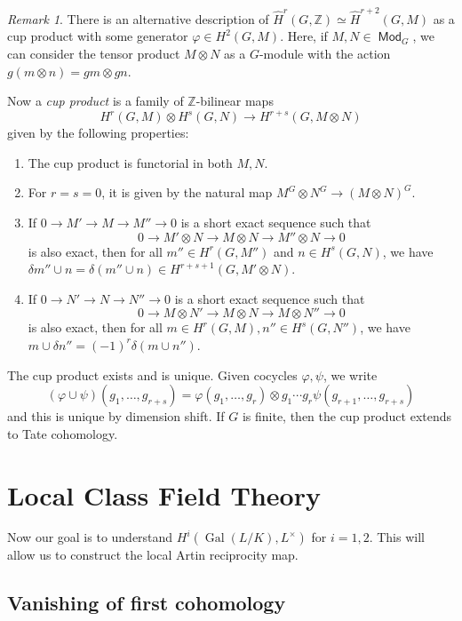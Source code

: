 \documentclass[leqno, openany]{memoir}
\theoremstyle{definition}
\theoremstyle{remark}
\newtheorem{rmk}[thm]{Remark}
\theoremstyle{plain}
\theoremstyle{definition}
\theoremstyle{remark}
\newcommand{\Z}{\mathbb{Z}}
\newcommand{\wh}[1]{\widehat{#1}}
\DeclareMathOperator{\Gal}{Gal}
\DeclareMathOperator{\Mod}{\mathsf{Mod}}
\begin{document}
\begin{rmk}
    There is an alternative description of $\wh{H}^r(G, \Z) \simeq \wh{H}^{r+2}(G, M)$ as a cup product with some generator $\varphi \in H^2(G, M)$. Here, if $M, N \in \Mod_G$, we can consider the tensor product $M \otimes N$ as a $G$-module with the action $g(m \otimes n) = gm \otimes gn$.

    Now a \textit{cup product} is a family of $\Z$-bilinear maps 
    \[ H^r(G, M) \otimes H^s(G, N) \to H^{r+s}(G, M \otimes N) \]
    given by the following properties:
    \begin{enumerate}
        \item The cup product is functorial in both $M, N$.
        \item For $r = s = 0$, it is given by the natural map $M^G \otimes N^G \to {(M \otimes N)}^G$.
        \item If $0 \to M' \to M \to M'' \to 0$ is a short exact sequence such that
            \[ 0 \to M' \otimes N \to M \otimes N \to M'' \otimes N \to 0 \]
            is also exact, then for all $m'' \in H^r(G, M'')$ and $n \in H^s(G, N)$, we have $\delta m'' \cup n = \delta (m'' \cup n) \in H^{r+s+1}(G, M' \otimes N)$.
        \item If $0 \to N' \to N \to N'' \to 0$ is a short exact sequence such that
            \[ 0 \to M \otimes N' \to M \otimes N \to M \otimes N'' \to 0 \]
            is also exact, then for all $m \in H^r(G, M), n'' \in H^s(G, N'')$, we have $m \cup \delta n'' = {(-1)}^r \delta(m \cup n'')$.
    \end{enumerate}
    The cup product exists and is unique. Given cocycles $\varphi, \psi$, we write
    \[ (\varphi \cup \psi) (g_1, \ldots, g_{r+s}) = \varphi(g_1, \ldots, g_r) \otimes g_1 \cdots g_r \psi(g_{r+1}, \ldots, g_{r+s}) \]
    and this is unique by dimension shift. If $G$ is finite, then the cup product extends to Tate cohomology.
\end{rmk}

\chapter{Local Class Field Theory}%
\label{cha:local_class_field_theory-2}

Now our goal is to understand $H^i(\Gal(L/K), L^{\times})$ for $i = 1,2$. This will allow us to construct the local Artin reciprocity map.

\section{Vanishing of first cohomology}%
\label{sec:vanishing_of_first_cohomology}
\end{document}
